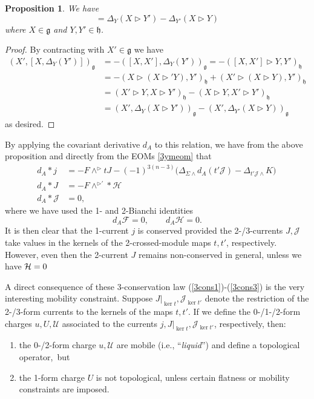 \documentclass[onecolumn]{article}
\theoremstyle{theorem}
\newtheorem{proposition}{Proposition}[section]
\theoremstyle{remark}
\theoremstyle{example}
\theoremstyle{definition}
\numberwithin{equation}{section}
\newcommand{\cH}{{\cal H}}
\begin{document}
\begin{proposition}
    We have
    \begin{equation}
        [X,\Delta_Y(Y')] = \Delta_Y(X\rhd Y') - \Delta_{Y'}(X\rhd Y)
    \end{equation}
    where $X\in\mathfrak{g}$ and $Y,Y'\in\mathfrak{h}$.
\end{proposition}
\begin{proof}
    By contracting with $X'\in\mathfrak{g}$ we have
    \begin{align*}
        ( X',[X,\Delta_Y(Y')])_\mathfrak{g} &= -([X,X'],\Delta_Y(Y'))_\mathfrak{g} = -( [X,X']\rhd Y,Y')_\mathfrak{h} \\
        &= -( X\rhd (X\rhd' Y),Y')_\mathfrak{h} +( X'\rhd(X\rhd Y),Y')_\mathfrak{h} \\ 
        &= ( X'\rhd Y,X\rhd Y')_\mathfrak{h} - ( X\rhd Y,X'\rhd Y')_\mathfrak{h} \\
         &= ( X',\Delta_Y(X\rhd Y'))_\mathfrak{g} -( X',\Delta_{Y'}(X\rhd Y))_\mathfrak{g}
    \end{align*}
    as desired.
\end{proof}


By applying the covariant derivative $d_A$ to this relation, we have from the above proposition and directly from the EOMs \eqref{3ymeom} that
\begin{align}
    d_A\ast j &= - F\wedge^\rhd tJ - (-1)^{3(n-3)}\Big( \Delta_{\Sigma\wedge}d_A(t'\mathcal{J}) - \Delta_{t'\mathcal{J}\wedge} K\Big)\,\label{3cons1} \\ 
    d_A\ast J &= -F\wedge^{\rhd'} \ast \mathcal{H} \label{3cons2}\\
    d_A\ast \mathcal{J}&= 0,\label{3cons3}
\end{align}
where we have used the 1- and 2-Bianchi identities
\begin{equation*}
    d_A\mathcal{F} =0 ,\qquad d_A\mathcal{H} = 0.
\end{equation*}
{It} is then clear that the 1-current $j$ is conserved provided the 2-/3-currents $J,\mathcal{J}$ take values in the kernels of the 2-crossed-module maps $t,t'$, respectively. However, even then the 2-current $J$ remains {{non-conserved}} in general, unless we have $\cH=0$



A direct consequence of these 3-conservation law  (\ref{3cons1})-(\ref{3cons3}) is the very interesting mobility constraint. Suppose $J|_{\operatorname{ker}t},\mathcal{J}_{\operatorname{ker}t'}$ denote the restriction of the 2-/3-form currents to the kernels of the maps $t,t'$. If we define the 0-/1-/2-form charges $u,U,\mathcal{U}$ associated to the currents $j,J|_{\operatorname{ker}t},\mathcal{J}_{\operatorname{ker}t'}$, respectively, then:
\begin{enumerate}
    \item the 0-/2-form charge $u,\mathcal{U}$ are mobile (i.e., ``\textit{{liquid}}'') and define a topological operator,~but
    \item the 1-form charge $U$ is {{not}} topological, unless certain flatness or mobility constraints are imposed.
\end{enumerate}
\end{document}
